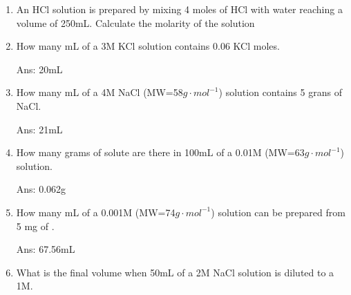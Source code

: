 \documentclass[main.tex]{subfiles}
\begin{document}
\begin{multicols*}{2}
\begin{enumerate}
\item An HCl solution is prepared by mixing 4 moles of HCl with water reaching a volume of 250mL. Calculate the molarity of the solution
\begin{enumerate}[label=(\alph*)]
\end{enumerate}


\item How many mL of a 3M KCl solution contains 0.06 KCl moles.
\begin{flushright}\small Ans: 20mL\end{flushright}


\item How many mL of a 4M NaCl (MW=58$g\cdot mol^{-1}$) solution contains 5 grans of NaCl.
\begin{flushright}\small Ans: 21mL\end{flushright}

\item How many grams of solute are there in 100mL of a 0.01M  (MW=63$g\cdot mol^{-1}$) solution.
\begin{flushright}\small Ans: 0.062g\end{flushright}


\item How many mL of a 0.001M  (MW=74$g\cdot mol^{-1}$) solution can be prepared from 5 mg of .
\begin{flushright}\small Ans: 67.56mL\end{flushright}



\item What is the final volume when 50mL of a 2M NaCl solution is diluted to a 1M.
\begin{enumerate}[label=(\alph*)]
\end{enumerate}



\end{enumerate}
\end{multicols*}
\end{document}
